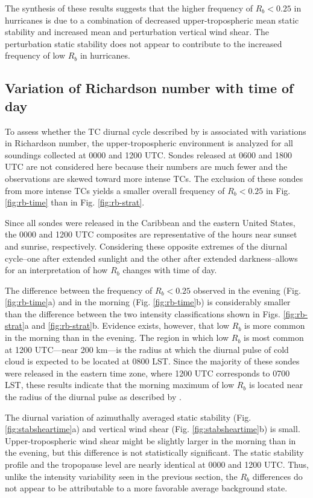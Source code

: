 The synthesis of these results suggests that the higher frequency of $R_b < 0.25$ in hurricanes is due to a combination of decreased upper-tropospheric mean static stability and increased mean and perturbation vertical wind shear.
The perturbation static stability does not appear to contribute to the increased frequency of low $R_b$ in hurricanes.

\subsection{Variation of Richardson number with time of day}

To assess whether the TC diurnal cycle described by \cite{Dunionetal2014} is associated with variations in Richardson number, the upper-tropospheric environment is analyzed for all soundings collected at 0000 and 1200 UTC.
Sondes released at 0600 and 1800 UTC are not considered here because their numbers are much fewer and the observations are skewed toward more intense TCs.
The exclusion of these sondes from more intense TCs yields a smaller overall frequency of $R_b < 0.25$ in Fig. \ref{fig:rb-time} than in Fig. \ref{fig:rb-strat}.

Since all sondes were released in the Caribbean and the eastern United States, the 0000 and 1200 UTC composites are representative of the hours near sunset and sunrise, respectively.
Considering these opposite extremes of the diurnal cycle--one after extended sunlight and the other after extended darkness--allows for an interpretation of how $R_b$ changes with time of day.

The difference between the frequency of $R_b < 0.25$ observed in the evening (Fig. \ref{fig:rb-time}a) and in the morning (Fig. \ref{fig:rb-time}b) is considerably smaller than the difference between the two intensity classifications shown in Figs. \ref{fig:rb-strat}a and \ref{fig:rb-strat}b.
Evidence exists, however, that low $R_b$ is more common in the morning than in the evening.
The region in which low $R_b$ is most common at 1200 UTC---near 200 km---is the radius at which the diurnal pulse of cold cloud is expected to be located at 0800 LST.
Since the majority of these sondes were released in the eastern time zone, where 1200 UTC corresponds to 0700 LST, these results indicate that the morning maximum of low $R_b$ is located near the radius of the diurnal pulse as described by \cite{Dunionetal2014}.

The diurnal variation of azimuthally averaged static stability (Fig. \ref{fig:stabsheartime}a) and vertical wind shear (Fig. \ref{fig:stabsheartime}b) is small.
Upper-tropospheric wind shear might be slightly larger in the morning than in the evening, but this difference is not statistically significant.
The static stability profile and the tropopause level are nearly identical at 0000 and 1200 UTC.
Thus, unlike the intensity variability seen in the previous section, the $R_b$ differences do not appear to be attributable to a more favorable average background state.

